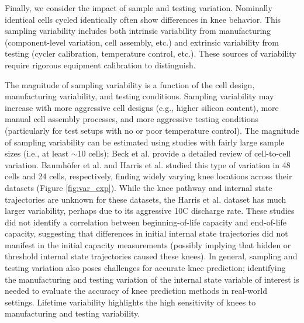 \documentclass[journal=jpclcd,manuscript=article]{achemso}
\begin{document}
Finally, we consider the impact of sample and testing variation. Nominally identical cells cycled identically often show differences in knee behavior. This sampling variability includes both intrinsic variability from manufacturing (component-level variation, cell assembly, etc.) and extrinsic variability from testing (cycler calibration, temperature control, etc.). These sources of variability require rigorous equipment calibration to distinguish.

The magnitude of sampling variability is a function of the cell design, manufacturing variability, and testing conditions. Sampling variability may increase with more aggressive cell designs (e.g., higher silicon content), more manual cell assembly processes, and more aggressive testing conditions (particularly for test setups with no or poor temperature control). The magnitude of sampling variability can be estimated using studies with fairly large sample sizes (i.e., at least $\sim$10 cells)\cite{dechent_estimation_2021}{}; Beck et al.\cite{beck_inhomogeneities_2021} provide a detailed review of cell-to-cell variation. Baumhöfer et al.\cite{baumhofer_production_2014} and Harris et al.\cite{harris_failure_2017} studied this type of variation in 48 cells and 24 cells, respectively, finding widely varying knee locations across their datasets (Figure \ref{fig:var_exp}).
While the knee pathway and internal state trajectories are unknown for these datasets, the Harris et al.\cite{harris_failure_2017} dataset has much larger variability, perhaps due to its aggressive 10C discharge rate.
These studies did not identify a correlation between beginning-of-life capacity and end-of-life capacity, suggesting that differences in initial internal state trajectories did not manifest in the initial capacity measurements (possibly implying that hidden or threshold internal state trajectories caused these knees). In general, sampling and testing variation also poses challenges for accurate knee prediction; identifying the manufacturing and testing variation of the internal state variable of interest is needed to evaluate the accuracy of knee prediction methods in real-world settings.
Lifetime variability highlights the high sensitivity of knees to manufacturing and testing variability.
\end{document}
